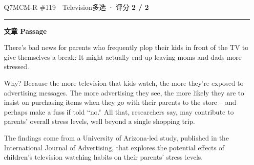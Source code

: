 \documentclass[11pt]{article}
\newcommand{\ptesub}[1]{%
  \par\needspace{2\baselineskip}\smallskip
  {\color{cAccent}\rule[-0.2ex]{3pt}{1.05em}}\hspace{6pt}%
  {\bfseries\color{cHead}#1}\par\nopagebreak\smallskip}
\begin{document}
\begin{qblock}{Q7\quad MCM-R \#119\ \ Television}{多选 · 评分 \textcolor{cAccent}{\bfseries 2 / 2}}
\ptesub{文章 Passage}
\begin{promptbox}
There's bad news for parents who frequently plop their kids in front of the TV to give themselves a break: It might actually end up leaving moms and dads more stressed.

Why? Because the more television that kids watch, the more they're exposed to advertising messages. The more advertising they see, the more likely they are to insist on purchasing items when they go with their parents to the store -- and perhaps make a fuss if told ``no.'' All that, researchers say, may contribute to parents' overall stress levels, well beyond a single shopping trip.

The findings come from a University of Arizona-led study, published in the International Journal of Advertising, that explores the potential effects of children's television watching habits on their parents' stress levels.


\end{promptbox}
\end{qblock}
\end{document}

